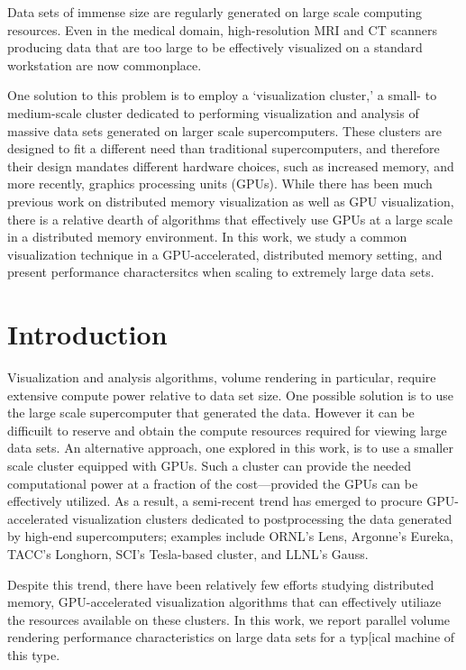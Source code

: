 Data sets of immense size are regularly generated on large scale
computing resources.  Even in the medical domain, high-resolution MRI
and CT scanners producing data that are too large to be effectively
visualized on a standard workstation are now commonplace.

One solution to this problem is to employ a `visualization cluster,' a
small- to medium-scale cluster dedicated to performing visualization
and analysis of massive data sets generated on larger scale
supercomputers. These clusters are designed to fit a different
need than traditional supercomputers, and therefore their design
mandates different hardware choices, such as increased memory, and
more recently, graphics processing units (GPUs).  While there has
been much previous work on distributed memory visualization as well
as GPU visualization, there is a relative dearth of algorithms
that effectively use GPUs at a large scale in a distributed memory
environment.  In this work, we study a common visualization technique
in a GPU-accelerated, distributed memory setting, and present
performance charactersitcs when scaling to extremely large data sets.

\section{Introduction}
\label{sec:introduction}

Visualization and analysis algorithms, volume rendering in particular,
require extensive compute power relative to data set size.  One
possible solution is to use the large scale supercomputer that
generated the data.  However it can be difficuilt to reserve and
obtain the compute resources required for viewing large data sets.  An
alternative approach, one explored in this work, is to use a smaller
scale cluster equipped with GPUs.  Such a cluster can provide the
needed computational power at a fraction of the cost---provided the
GPUs can be effectively utilized.  As a result, a semi-recent trend has
emerged to procure GPU-accelerated visualization clusters dedicated
to postprocessing the data generated by high-end supercomputers;
examples include ORNL's Lens, Argonne's Eureka, TACC's Longhorn, SCI's
Tesla-based cluster, and LLNL's Gauss.

Despite this trend, there have been relatively few efforts studying distributed
memory, GPU-accelerated visualization algorithms that can effectively utiliaze
the resources available on these clusters.  In this work, we report parallel
volume rendering performance characteristics on large data sets for a typ[ical
machine of this type.

